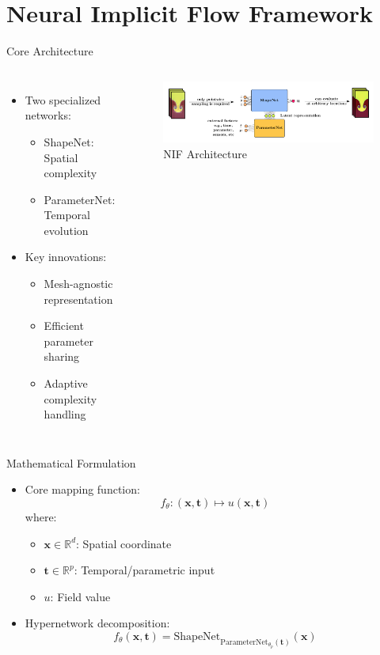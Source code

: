 \documentclass{beamer}
\begin{document}
\section{Neural Implicit Flow Framework}
\begin{frame}{Core Architecture}
    \begin{columns}
        \begin{itemize}
            \item Two specialized networks:
            \begin{itemize}
                \item ShapeNet: Spatial complexity
                \item ParameterNet: Temporal evolution
            \end{itemize}
            \item Key innovations:
            \begin{itemize}
                \item Mesh-agnostic representation
                \item Efficient parameter sharing
                \item Adaptive complexity handling
            \end{itemize}
        \end{itemize}
        
        \begin{figure}
            \includegraphics[width=\textwidth]{../../20-minute-presentation/latex/hypernetwork_diagram}
            \caption{NIF Architecture}
        \end{figure}
    \end{columns}
\end{frame}

\begin{frame}{Mathematical Formulation}
    \begin{itemize}
        \item Core mapping function:
        \[ f_\theta: (\mathbf{x}, \mathbf{t}) \mapsto u(\mathbf{x}, \mathbf{t}) \]
        where:
        \begin{itemize}
            \item $\mathbf{x} \in \mathbb{R}^d$: Spatial coordinate
            \item $\mathbf{t} \in \mathbb{R}^p$: Temporal/parametric input
            \item $u$: Field value
        \end{itemize}
        \item Hypernetwork decomposition:
        \[ f_\theta(\mathbf{x}, \mathbf{t}) = \text{ShapeNet}_{\text{ParameterNet}_{\theta_p}(\mathbf{t})}(\mathbf{x}) \]
    \end{itemize}
\end{frame}
\end{document}
